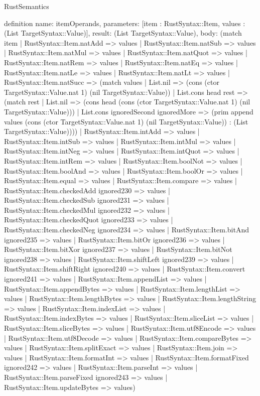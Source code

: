 \begin{lexlean}{RustSemantics}
\begin{semanticmodule}
definition{
  name: itemOperands,
  parameters: [item : RustSyntax::Item, values : (List TargetSyntax::Value)],
  result: (List TargetSyntax::Value),
  body: (match item
    | RustSyntax::Item.natAdd => values
    | RustSyntax::Item.natSub => values
    | RustSyntax::Item.natMul => values
    | RustSyntax::Item.natQuot => values
    | RustSyntax::Item.natRem => values
    | RustSyntax::Item.natEq => values
    | RustSyntax::Item.natLe => values
    | RustSyntax::Item.natLt => values
    | RustSyntax::Item.natSucc => (match values
      | List.nil => (cons (ctor TargetSyntax::Value.nat 1) (nil TargetSyntax::Value))
      | List.cons head rest => (match rest
        | List.nil => (cons head (cons (ctor TargetSyntax::Value.nat 1) (nil TargetSyntax::Value)))
        | List.cons ignoredSecond ignoredMore => (prim append values (cons (ctor TargetSyntax::Value.nat 1) (nil TargetSyntax::Value)) : (List TargetSyntax::Value))))
    | RustSyntax::Item.intAdd => values
    | RustSyntax::Item.intSub => values
    | RustSyntax::Item.intMul => values
    | RustSyntax::Item.intNeg => values
    | RustSyntax::Item.intQuot => values
    | RustSyntax::Item.intRem => values
    | RustSyntax::Item.boolNot => values
    | RustSyntax::Item.boolAnd => values
    | RustSyntax::Item.boolOr => values
    | RustSyntax::Item.equal => values
    | RustSyntax::Item.compare => values
    | RustSyntax::Item.checkedAdd ignored230 => values
    | RustSyntax::Item.checkedSub ignored231 => values
    | RustSyntax::Item.checkedMul ignored232 => values
    | RustSyntax::Item.checkedQuot ignored233 => values
    | RustSyntax::Item.checkedNeg ignored234 => values
    | RustSyntax::Item.bitAnd ignored235 => values
    | RustSyntax::Item.bitOr ignored236 => values
    | RustSyntax::Item.bitXor ignored237 => values
    | RustSyntax::Item.bitNot ignored238 => values
    | RustSyntax::Item.shiftLeft ignored239 => values
    | RustSyntax::Item.shiftRight ignored240 => values
    | RustSyntax::Item.convert ignored241 => values
    | RustSyntax::Item.appendList => values
    | RustSyntax::Item.appendBytes => values
    | RustSyntax::Item.lengthList => values
    | RustSyntax::Item.lengthBytes => values
    | RustSyntax::Item.lengthString => values
    | RustSyntax::Item.indexList => values
    | RustSyntax::Item.indexBytes => values
    | RustSyntax::Item.sliceList => values
    | RustSyntax::Item.sliceBytes => values
    | RustSyntax::Item.utf8Encode => values
    | RustSyntax::Item.utf8Decode => values
    | RustSyntax::Item.compareBytes => values
    | RustSyntax::Item.splitExact => values
    | RustSyntax::Item.join => values
    | RustSyntax::Item.formatInt => values
    | RustSyntax::Item.formatFixed ignored242 => values
    | RustSyntax::Item.parseInt => values
    | RustSyntax::Item.parseFixed ignored243 => values
    | RustSyntax::Item.updateBytes => values)
}


\end{semanticmodule}
\end{lexlean}
